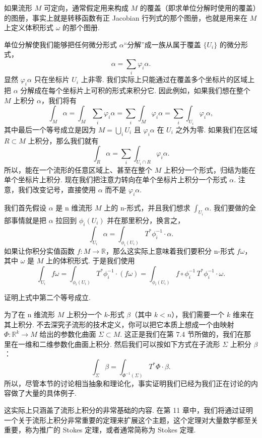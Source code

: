 如果流形 $M$ 可定向，通常假定用来构成 $M$ 的覆盖（即求单位分解时使用的覆盖）的图册，事实上就是转移函数有正 Jacobian 行列式的那个图册，也就是用来在 $M$ 上定义体积形式 $\omega$ 的那个图册.

单位分解使我们能够把任何微分形式 $\alpha$``分解''成一族从属于覆盖 $\{U_i\}$ 的微分形式，
\[
\alpha=\sum_i\varphi_i\alpha.
\]
显然 $\varphi_i\alpha$ 只在坐标片 $U_i$ 上非零. 我们实际上只能通过在覆盖多个坐标片的区域上把 $\alpha$ 分解成在每个坐标片上可积的形式来积分它. 因此例如，如果我们想在整个 $M$ 上积分 $\alpha$，我们将有
\[
\int_M\alpha=\int_M\sum_i\varphi_i\alpha=\sum_i\int_M\varphi_i\alpha=\sum_i\int_{U_i}\varphi_i\alpha,
\]
其中最后一个等号成立是因为 $M=\bigcup_iU_i$ 且 $\varphi_i\alpha$ 在 $U_i$ 之外为零. 如果我们在区域 $R\subset M$ 上积分，那么我们就有
\[
\int_R\alpha=\sum_i\int_{U_i\cap R}\varphi_i\alpha.
\]
所以，能在一个流形的任意区域上、甚至在整个 $M$ 上积分一个形式，归结为能在单个坐标片上积分. 现在我们把注意力转向在单个坐标片上积分一个形式 $\alpha$. 注意，我们改变记号，直接使用 $\alpha$ 而不是 $\varphi_i\alpha$.

我们首先假设 $\alpha$ 是 n 维流形 $M$ 上的 n-形式，并且我们想求 $\int_{U_i}\alpha$. 我们要做的全部事情就是把 $\alpha$ 拉回到 $\phi_i(U_i)$ 并在那里积分，换言之，
\[
\int_{U_i}\alpha=\int_{\phi_i(U_i)}T^*\phi_i^{-1}\cdot\alpha.
\]
如果让你积分实值函数 $f:M\to\mathbb{R}$，那么这实际上意味着我们要积分 n-形式 $f\omega$，其中 $\omega$ 是 $M$ 上的体积形式. 于是我们使用
\[
\int_{U_i}f\omega=\int_{\phi_i(U_i)}T^*\phi_i^{-1}\cdot(f\omega)=\int_{\phi_i(U_i)}f\circ\phi_i^{-1}\,T^*\phi_i^{-1}\cdot\omega.
\]

\begin{question}\label{q:10-4}
证明上式中第二个等号成立.
\end{question}

为了在 n 维流形 $M$ 上积分一个 $k$-形式 $\beta$（其中 $k<n$），我们需要一个 $k$ 维来在其上积分. 不去深究子流形的技术定义，你可以把它本质上想成一个由映射 $\Phi:\mathbb{R}^k\to M$ 给出的参数化曲面 $\Sigma\subset M$. 这正是我们在第 7.4 节所做的，我们在那里在一维和二维参数化曲面上积分. 然后我们可以按如下方式在子流形 $\Sigma$ 上积分 $\beta$：
\[
\int_{\Sigma}\beta=\int_{\Phi^{-1}(\Sigma)}T^*\Phi\cdot\beta.
\]
所以，尽管本节的讨论相当抽象和理论化，事实证明我们已经为我们正在讨论的内容做了大量的具体例子.

这实际上只涵盖了流形上积分的非常基础的内容. 在第 11 章中，我们将通过证明一个关于流形上积分非常重要的定理来扩展这个主题，这个定理对大量数学都至关重要，称为推广的 Stokes 定理，或者通常简称为 Stokes 定理.


